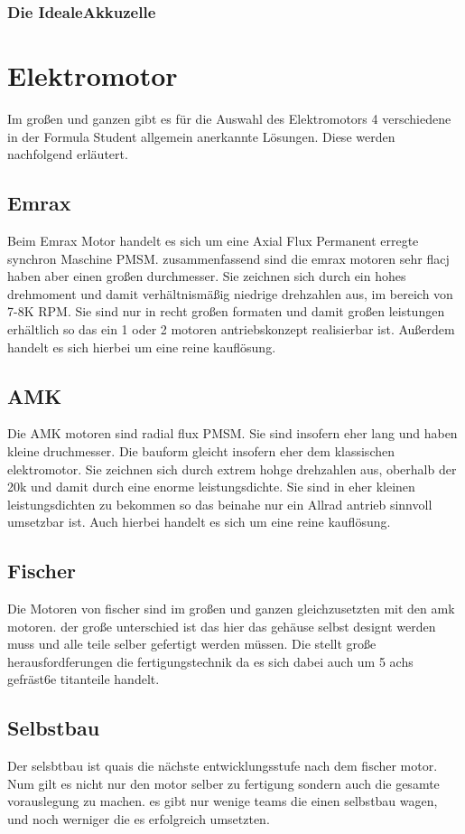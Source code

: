 \subsubsection{Die \glqq Ideale\grqq Akkuzelle}

\section{Elektromotor}
Im großen und ganzen gibt es für die Auswahl des Elektromotors 4 verschiedene in der Formula Student allgemein anerkannte Lösungen. Diese werden nachfolgend erläutert.

\subsection{Emrax}
Beim Emrax Motor handelt es sich um eine Axial Flux Permanent erregte synchron Maschine PMSM. zusammenfassend sind die emrax motoren sehr flacj haben aber einen großen durchmesser. Sie zeichnen sich durch ein hohes drehmoment und damit verhältnismäßig niedrige drehzahlen aus, im bereich von 7-8K RPM. Sie sind nur in recht großen formaten und damit großen leistungen erhältlich so das ein 1 oder 2 motoren antriebskonzept realisierbar ist. Außerdem handelt es sich hierbei um eine reine kauflösung. 

\subsection{AMK}
Die AMK motoren sind radial flux PMSM. Sie sind insofern eher lang und haben kleine druchmesser. Die bauform gleicht insofern eher dem klassischen elektromotor. Sie zeichnen sich durch extrem hohge drehzahlen aus, oberhalb der 20k und damit durch eine enorme leistungsdichte. Sie sind in eher kleinen leistungsdichten zu bekommen so das beinahe nur ein Allrad antrieb sinnvoll umsetzbar ist. Auch hierbei handelt es sich um eine reine kauflösung. 

\subsection{Fischer}
Die Motoren von fischer sind im großen und ganzen gleichzusetzten mit den amk motoren. der große unterschied ist das hier das gehäuse selbst designt werden muss und alle teile selber gefertigt werden müssen. Die stellt große herausfordferungen die fertigungstechnik da es sich dabei auch um 5 achs gefräst6e titanteile handelt. 

\subsection{Selbstbau}
Der selsbtbau ist quais die nächste entwicklungsstufe nach dem fischer motor. Num gilt es nicht nur den motor selber zu fertigung sondern auch die gesamte vorauslegung zu machen. es gibt nur wenige teams die einen selbstbau wagen, und noch werniger die es erfolgreich umsetzten.

